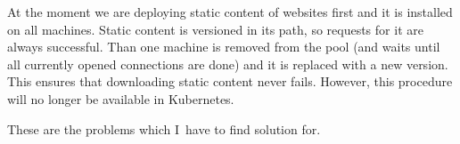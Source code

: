 At the moment we are deploying static content of websites first and it is installed on all machines. Static content is versioned in its path, so requests for it are always successful. Than one machine is removed from the pool (and waits until all currently opened connections are done) and it is replaced with a new version. This ensures that downloading static content never fails. However, this procedure will no longer be available in Kubernetes.

\begin{flushleft}
These are the problems which I~have to find solution for.
\end{flushleft} 
